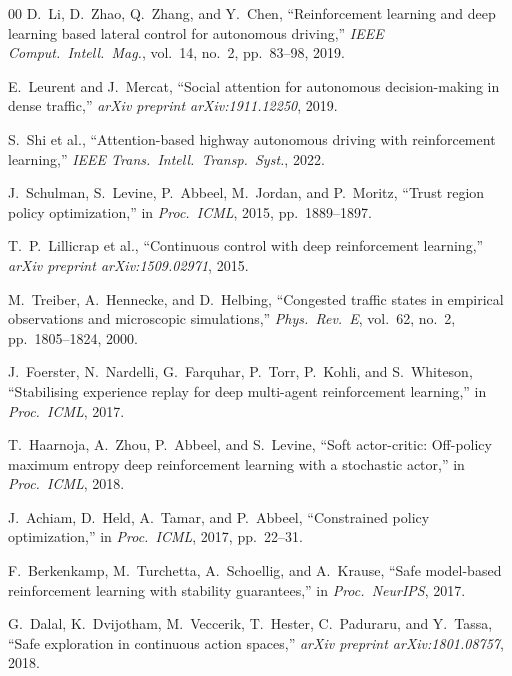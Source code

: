 \documentclass[conference]{IEEEtran}
\begin{document}
\begin{thebibliography}{00}
D.\ Li, D.\ Zhao, Q.\ Zhang, and Y.\ Chen,
``Reinforcement learning and deep learning based lateral control for autonomous driving,''
\textit{IEEE Comput.\ Intell.\ Mag.}, vol.\ 14, no.\ 2, pp.\ 83--98, 2019.

E.\ Leurent and J.\ Mercat,
``Social attention for autonomous decision-making in dense traffic,''
\textit{arXiv preprint arXiv:1911.12250}, 2019.

S.\ Shi et al., ``Attention-based highway autonomous driving with reinforcement learning,''
\textit{IEEE Trans.\ Intell.\ Transp.\ Syst.}, 2022.

J.\ Schulman, S.\ Levine, P.\ Abbeel, M.\ Jordan, and P.\ Moritz,
``Trust region policy optimization,''
in \textit{Proc.\ ICML}, 2015, pp.\ 1889--1897.

T.\ P.\ Lillicrap et al.,
``Continuous control with deep reinforcement learning,''
\textit{arXiv preprint arXiv:1509.02971}, 2015.

M.\ Treiber, A.\ Hennecke, and D.\ Helbing,
``Congested traffic states in empirical observations and microscopic simulations,''
\textit{Phys.\ Rev.\ E}, vol.\ 62, no.\ 2, pp.\ 1805--1824, 2000.

J.\ Foerster, N.\ Nardelli, G.\ Farquhar, P.\ Torr, P.\ Kohli, and S.\ Whiteson,
``Stabilising experience replay for deep multi-agent reinforcement learning,''
in \textit{Proc.\ ICML}, 2017.

T.\ Haarnoja, A.\ Zhou, P.\ Abbeel, and S.\ Levine,
``Soft actor-critic: Off-policy maximum entropy deep reinforcement learning
with a stochastic actor,''
in \textit{Proc.\ ICML}, 2018.

J.\ Achiam, D.\ Held, A.\ Tamar, and P.\ Abbeel,
``Constrained policy optimization,''
in \textit{Proc.\ ICML}, 2017, pp.\ 22--31.

F.\ Berkenkamp, M.\ Turchetta, A.\ Schoellig, and A.\ Krause,
``Safe model-based reinforcement learning with stability guarantees,''
in \textit{Proc.\ NeurIPS}, 2017.

G.\ Dalal, K.\ Dvijotham, M.\ Veccerik, T.\ Hester, C.\ Paduraru, and Y.\ Tassa,
``Safe exploration in continuous action spaces,''
\textit{arXiv preprint arXiv:1801.08757}, 2018.


\end{thebibliography}
\end{document}
